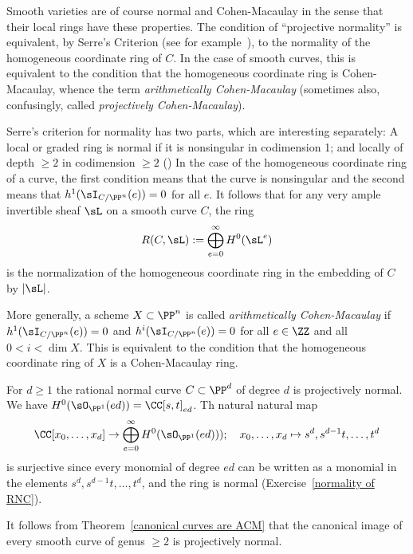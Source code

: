  
\begin{remark}
 Smooth varieties are of course normal and Cohen-Macaulay in the sense that their local rings have these properties. The condition of ``projective normality'' is equivalent, by Serre's Criterion (see for example~\cite[Section 11.2]{Eisenbud1995}), to the normality of the homogeneous coordinate ring of $C$. In the case of smooth curves, this is equivalent to the condition that the homogeneous coordinate
ring is Cohen-Macaulay, whence the term \emph{arithmetically Cohen-Macaulay} (sometimes also, confusingly, called
\emph{projectively Cohen-Macaulay}).


Serre's criterion for normality has two parts, which are interesting separately: A local or graded ring is normal if it is nonsingular in
codimension 1; and
locally of depth $\geq 2$ in codimension $\geq 2$ (\cite[Theorem 11.5]{Eisenbud1995}) In the case of the homogeneous coordinate ring of a curve, 
the first condition means that the curve is nonsingular and the second means that $h^1(\sI_{C/\PP^n}(e))=0$ for all $e$.
It follows that for any very ample invertible sheaf $\sL$ on a smooth curve $C$, the ring 
$$
R(C, \sL) := \bigoplus_{e=0}^\infty H^0(\sL^e)
$$
is the normalization of the homogeneous coordinate ring in the embedding of $C$ by $|\sL|$.

More generally, a scheme
$X\subset \PP^n$ is called \emph{arithmetically Cohen-Macaulay} if 
$h^1(\sI_{C/\PP^n}(e))=0$ and $h^i(\sI_{C/\PP^n}(e))=0$ for all $e\in \ZZ$ and all $0<i<\dim X$.
This is equivalent to the condition that the homogeneous coordinate ring of $X$ is a Cohen-Macaulay
ring.

\end{remark}

\begin{example}\label{rnc is projectively normal}
For $d\geq 1$ the rational normal curve $C\subset \PP^d$ of degree $d$ is projectively normal. 
We have $H^0(\sO_{\PP^1}(ed))  = \CC[s,t]_{ed}$. Th natural natural map
$$
\CC[x_0,\dots,x_d] \to\bigoplus_{e = 0}^\infty H^0(\sO_{\PP^1}(ed)));\quad x_0,\dots, x_d \mapsto s^d,s^{d-1}t,\dots, t^d
$$ 
is surjective since every monomial of degree $ed$ can be written as a monomial in  
the elements $s^d,s^{d-1}t,\dots, t^d$, and the ring is normal (Exercise~\ref{normality of RNC}).
\end{example}

It follows from Theorem~\ref{canonical curves are ACM} that the canonical image of every smooth curve of genus $\geq 2$ is projectively normal. 

